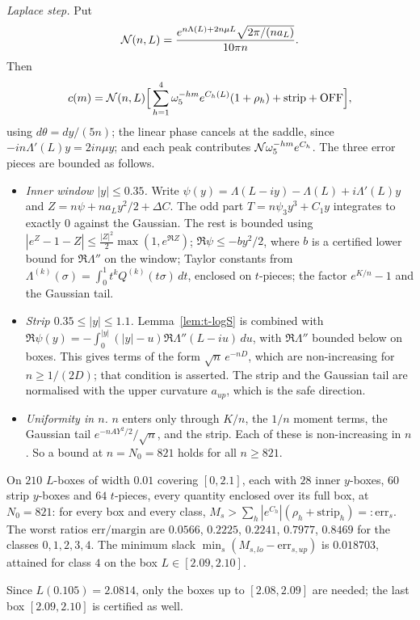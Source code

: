 \emph{Laplace step.} Put
\[
\mathcal N(n,L)=\frac{e^{n\Lambda(L)+2n\mu L}\sqrt{2\pi/(na_L)}}{10\pi n}.
\]
Then
\[
c(m)=\mathcal N(n,L)\Big[\sum_{h=1}^4\omega_5^{-hm}e^{C_h(L)}(1+\rho_h)+\mathrm{strip}+\mathrm{OFF}\Big],
\]
using $d\theta=dy/(5n)$; the linear phase cancels at the saddle, since $-in\Lambda'(L)y=2in\mu y$; and each peak contributes
$\mathcal N\omega_5^{-hm}e^{C_h}$. The three error pieces are bounded as follows.
\begin{itemize}
\item \emph{Inner window $|y|\le0.35$.} Write $\psi(y)=\Lambda(L-iy)-\Lambda(L)+i\Lambda'(L)y$ and
$Z=n\psi+na_Ly^2/2+\Delta C$. The odd part $T=n\psi_3y^3+C_1y$ integrates to exactly $0$ against the Gaussian. The rest is
bounded using $|e^Z-1-Z|\le\frac{|Z|^2}2\max(1,e^{\Re Z})$; $\Re\psi\le-b y^2/2$, where $b$ is a certified lower bound for
$\Re \Lambda''$ on the window; Taylor constants from $\Lambda^{(k)}(\sigma)=\int_0^1t^kQ^{(k)}(t\sigma)\,dt$, enclosed on
$t$-pieces; the factor $e^{K/n}-1$ and the Gaussian tail.
\item \emph{Strip $0.35\le|y|\le1.1$.} Lemma~\ref{lem:t-logS} is combined with
$\Re\psi(y)=-\int_0^{|y|}(|y|-u)\Re \Lambda''(L-iu)\,du$, with $\Re \Lambda''$ bounded below on boxes. This gives terms of
the form $\sqrt n\,e^{-nD}$, which are non-increasing for $n\ge1/(2D)$; that condition is asserted. The strip and the
Gaussian tail are normalised with the upper curvature $a_{up}$, which is the safe direction.
\item \emph{Uniformity in $n$.} $n$ enters only through $K/n$, the $1/n$ moment terms, the Gaussian tail
$e^{-nAY^2/2}/\sqrt n$, and the strip. Each of these is non-increasing in $n$. So a bound at $n=N_0=821$ holds for all
$n\ge821$.
\end{itemize}

\begin{lemma}\label{lem:t-nearpeak}
On $210$ $L$-boxes of width $0.01$ covering $[0,2.1]$, each with $28$ inner $y$-boxes, $60$ strip $y$-boxes and $64$
$t$-pieces, every quantity enclosed over its full box, at $N_0=821$: for every box and every class,
$M_s>\sum_h|e^{C_h}|(\rho_h+\mathrm{strip}_h)=:\mathrm{err}_s$. The worst ratios $\mathrm{err}/\mathrm{margin}$ are
$0.0566$, $0.2225$, $0.2241$, $0.7977$, $0.8469$ for the classes $0,1,2,3,4$. The minimum slack
$\min_s(M_{s,lo}-\mathrm{err}_{s,up})$ is $0.018703$, attained for class $4$ on the box $L\in[2.09,2.10]$.
\end{lemma}
Since $L(0.105)=2.0814$, only the boxes up to $[2.08,2.09]$ are needed; the last box $[2.09,2.10]$ is certified as well.


